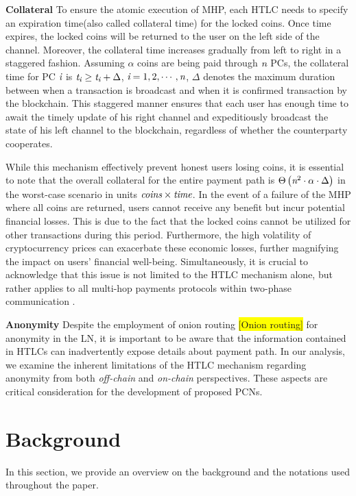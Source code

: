 \documentclass[conference]{IEEEtran}
\begin{document}
\textbf{Collateral} To ensure the atomic execution of MHP, each HTLC needs to specify an expiration time(also called collateral time) for the locked 
coins. Once time expires, the locked coins will be returned to the user on the left side of the channel. Moreover, the collateral time increases gradually
from left to right in a staggered fashion. Assuming $\alpha$ coins are being paid through $\emph{n}$ PCs, the collateral time for 
PC $\emph{i}$ is $\emph{t}_{\emph{i}}\geq\emph{t}_{\emph{i}}+\Delta$, $\emph{i}=1,2,\cdots ,\emph{n}$, $\Delta$ denotes
the maximum duration between when a transaction is broadcast and when it is confirmed transaction by the blockchain. This staggered manner
ensures that each user has enough time to await the timely update of his right channel and expeditiously broadcast the state of his left channel to
the blockchain, regardless of whether the counterparty cooperates. 

While this mechanism effectively prevent honest users losing coins, it is essential to note that the overall collateral for the entire payment path 
is $\Theta \left ( \emph{n}^{2}\cdot \alpha\cdot  \Delta  \right )$ in the worst-case scenario in units $ \emph{coins}\times \emph{time}$. 
In the event of a failure of the MHP where all coins are returned, users cannot receive any benefit but incur potential financial
losses. This is due to the fact that the locked coins cannot be utilized for other transactions during this period. Furthermore, the high 
volatility of cryptocurrency prices can exacerbate these economic losses, further magnifying the impact on users' financial well-being. 
Simultaneously, it is crucial to acknowledge that this issue is not limited to the HTLC mechanism alone, but rather
applies to all multi-hop payments protocols within two-phase communication \cite{aumayr2021blitz}. 

\textbf{Anonymity} Despite the employment of onion routing \colorbox{yellow}{[Onion routing]} for anonymity in the LN, it is important
to be aware that the information contained in HTLCs can inadvertently expose details about payment path. In our analysis,
we examine the inherent limitations of the HTLC mechanism regarding anonymity from both \textit{off-chain} and \textit{on-chain}
perspectives. These aspects are critical consideration for the development of proposed PCNs.



\section{Background}
In this section, we provide an overview on the background and the
notations used throughout the paper.
\end{document}
